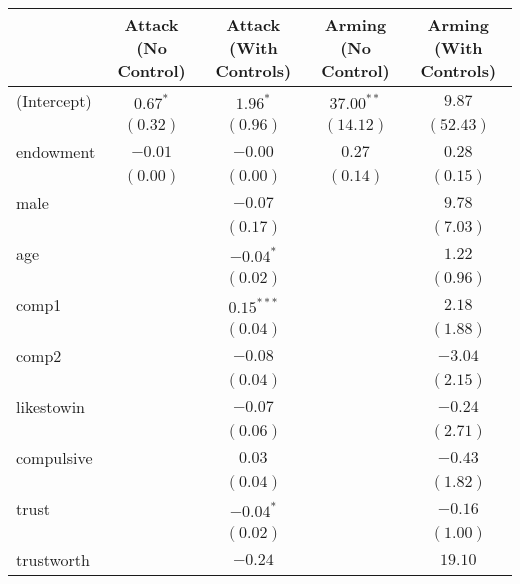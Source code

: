 
\begin{table}
\begin{center}
\begin{tabular}{l c c c c}
\hline
 & Attack (No Control) & Attack (With Controls) & Arming (No Control) & Arming (With Controls) \\
\hline
(Intercept)           & $0.67^{*}$ & $1.96^{*}$   & $37.00^{**}$ & $9.87$    \\
                      & $(0.32)$   & $(0.96)$     & $(14.12)$    & $(52.43)$ \\
endowment             & $-0.01$    & $-0.00$      & $0.27$       & $0.28$    \\
                      & $(0.00)$   & $(0.00)$     & $(0.14)$     & $(0.15)$  \\
male                  &            & $-0.07$      &              & $9.78$    \\
                      &            & $(0.17)$     &              & $(7.03)$  \\
age                   &            & $-0.04^{*}$  &              & $1.22$    \\
                      &            & $(0.02)$     &              & $(0.96)$  \\
comp1                 &            & $0.15^{***}$ &              & $2.18$    \\
                      &            & $(0.04)$     &              & $(1.88)$  \\
comp2                 &            & $-0.08$      &              & $-3.04$   \\
                      &            & $(0.04)$     &              & $(2.15)$  \\
likestowin            &            & $-0.07$      &              & $-0.24$   \\
                      &            & $(0.06)$     &              & $(2.71)$  \\
compulsive            &            & $0.03$       &              & $-0.43$   \\
                      &            & $(0.04)$     &              & $(1.82)$  \\
trust                 &            & $-0.04^{*}$  &              & $-0.16$   \\
                      &            & $(0.02)$     &              & $(1.00)$  \\
trustworth            &            & $-0.24$      &              & $19.10$   \\

\end{tabular}
\end{center}
\end{table}
